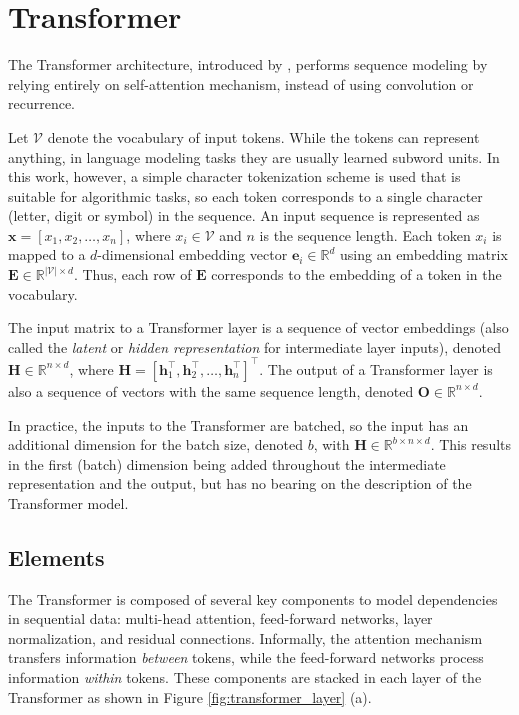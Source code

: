 \section{Transformer}\label{sec:transformer_arch}

The Transformer architecture, introduced by \textcite{vaswani_attention_2017}, performs sequence modeling by relying entirely on self-attention mechanism, instead of using convolution or recurrence.

Let $\mathcal{V}$ denote the vocabulary of input tokens. While the tokens can represent anything, in language modeling tasks they are usually learned subword units. In this work, however, a simple character tokenization scheme is used that is suitable for algorithmic tasks, so each token corresponds to a single character (letter, digit or symbol) in the sequence. An input sequence is represented as $\mathbf{x} = [x_1, x_2, \dots, x_n]$, where $x_i \in \mathcal{V}$ and $n$ is the sequence length. Each token $x_i$ is mapped to a $d$-dimensional embedding vector $\mathbf{e}_i \in \mathbb{R}^d$ using an embedding matrix $\mathbf{E} \in \mathbb{R}^{|\mathcal{V}| \times d}$. Thus, each row of $\mathbf{E}$ corresponds to the embedding of a token in the vocabulary.

The input matrix to a Transformer layer is a sequence of vector embeddings (also called the \emph{latent} or \emph{hidden representation} for intermediate layer inputs), denoted $\mathbf{H} \in \mathbb{R}^{n \times d}$, where $\mathbf{H} = [\mathbf{h}_1^\top, \mathbf{h}_2^\top, \dots, \mathbf{h}_n^\top]^\top$. The output of a Transformer layer is also a sequence of vectors with the same sequence length, denoted $\mathbf{O} \in \mathbb{R}^{n \times d}$.

In practice, the inputs to the Transformer are batched, so the input has an additional dimension for the batch size, denoted $b$, with $\mathbf{H} \in \mathbb{R}^{b \times n \times d}$. This results in the first (batch) dimension being added throughout the intermediate representation and the output, but has no bearing on the description of the Transformer model.

\subsection{Elements}\label{subsec:elements_transformers}

The Transformer is composed of several key components to model dependencies in sequential data: multi-head attention, feed-forward networks, layer normalization, and residual connections. Informally, the attention mechanism transfers information \emph{between} tokens, while the feed-forward networks process information \emph{within} tokens. These components are stacked in each layer of the Transformer as shown in Figure \ref{fig:transformer_layer} (a).


